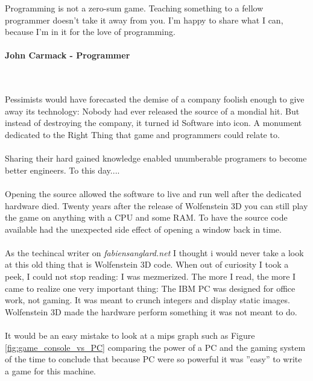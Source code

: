  \begin{fancyquotes}
   Programming is not a zero-sum game. Teaching something to a fellow programmer doesn't take it away from you. I'm happy to share what I can, because I'm in it for the love of programming.\\
   \\
\textbf{John Carmack - Programmer}
 \end{fancyquotes}\\
\\
Pessimists would have forecasted the demise of a company foolish enough to give away its technology: Nobody had ever released the source of a mondial hit. But instead of destroying the company, it turned id Software into icon. A monument dedicated to the Right Thing that game and programmers could relate to.\\
\\
Sharing their hard gained knowledge enabled unumberable programers to become better engineers. To this day.... \\
\\
Opening the source allowed the software to live and run well after the dedicated hardware died. Twenty years after the release of Wolfenstein 3D you can still play the game on anything with a CPU and some RAM. To have the source code available had the unexpected side effect of opening a window back in time.\\
\\
As the techincal writer on \emph{fabiensanglard.net} I thought i would never take a look at this old thing that is Wolfenstein 3D code. When out of curiosity I took a peek, I could not stop reading: I was mezmerized. The more I read, the more I came to realize one very important thing: The IBM PC was designed for office work, not gaming. It was meant to crunch integers and display static images. Wolfenstein 3D made the hardware perform something it was not meant to do.\\
\\
It would be an easy mistake to look at a mips graph such as Figure \ref{fig:game_console_vs_PC} comparing the power of a PC and the gaming system of the time to conclude that because PC were so powerful it was ''easy'' to write a game for this machine. \\
\\
